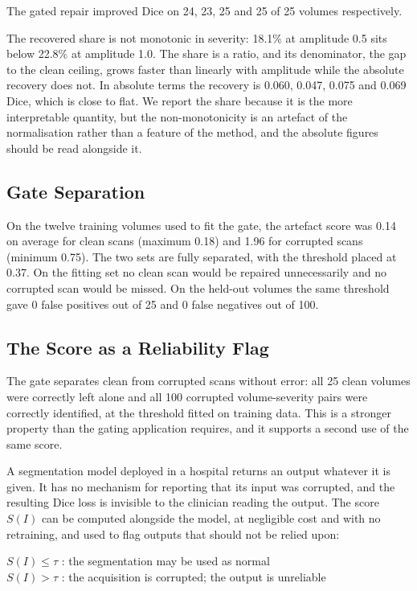 \documentclass[12pt]{article}
\theoremstyle{definition}
\theoremstyle{plain}
\begin{document}
The gated repair improved Dice on 24, 23, 25 and 25 of 25 volumes respectively.

The recovered share is not monotonic in severity: 18.1\% at amplitude 0.5 sits below
22.8\% at amplitude 1.0. The share is a ratio, and its denominator, the gap to the
clean ceiling, grows faster than linearly with amplitude while the absolute recovery
does not. In absolute terms the recovery is 0.060, 0.047, 0.075 and 0.069 Dice, which
is close to flat. We report the share because it is the more interpretable quantity,
but the non-monotonicity is an artefact of the normalisation rather than a feature of
the method, and the absolute figures should be read alongside it.

\subsection{Gate Separation}

On the twelve training volumes used to fit the gate, the artefact score was 0.14 on
average for clean scans (maximum 0.18) and 1.96 for corrupted scans (minimum 0.75).
The two sets are fully separated, with the threshold placed at 0.37. On the fitting
set no clean scan would be repaired unnecessarily and no corrupted scan would be
missed. On the held-out volumes the same threshold gave 0 false positives out of 25
and 0 false negatives out of 100.

\subsection{The Score as a Reliability Flag}

The gate separates clean from corrupted scans without error: all 25 clean volumes
were correctly left alone and all 100 corrupted volume-severity pairs were correctly
identified, at the threshold fitted on training data. This is a stronger property than the gating
application requires, and it supports a second use of the same score.

A segmentation model deployed in a hospital returns an output whatever it is given.
It has no mechanism for reporting that its input was corrupted, and the resulting
Dice loss is invisible to the clinician reading the output. The score $S(I)$ can be
computed alongside the model, at negligible cost and with no retraining, and used to
flag outputs that should not be relied upon:

\begin{center}
$S(I) \le \tau$ : the segmentation may be used as normal \\
$S(I) > \tau$ : the acquisition is corrupted; the output is unreliable
\end{center}
\end{document}
